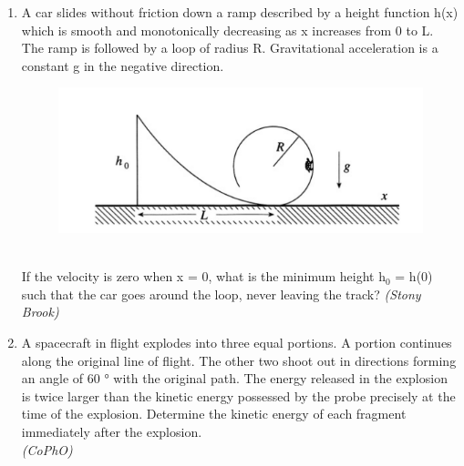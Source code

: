 \begin{enumerate}
\item A car slides without friction down a ramp described by a height function h(x)
which is smooth and monotonically decreasing as x increases from 0
to L. The ramp is followed by a loop of radius R. Gravitational acceleration 
is a constant g in the negative direction.\\ 
\begin{figure}[htp]
    \centering
    \includegraphics{mainmatter/kinem2.PNG}
    \label{fig:my_label}
\end{figure}\\
If the velocity is zero when x = 0, what is the minimum height h$_0$ = h(0)
such that the car goes around the loop, never leaving the track?
\hfill \textsl{(Stony Brook)}\\
\big[\textbf{Ans: }h$_0$ = $\dfrac{5}{2}$R\big]
\item A spacecraft in flight explodes into three equal portions. A portion continues along the original line of 
flight. The other two shoot out in directions forming an angle of 60 ° with the original path. The energy 
released in the explosion is twice larger than the kinetic energy possessed by the probe precisely at the time of the 
explosion. Determine the kinetic energy of each fragment immediately after the explosion. \\\hfill \textsl{(CoPhO)}


\end{enumerate}
